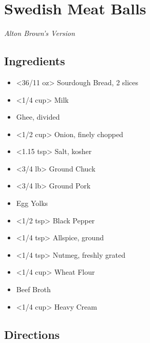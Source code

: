 \section{Swedish Meat Balls}
\textit{ Alton Brown's Version }

\subsection{ Ingredients }

\begin{itemize}
  \item <36/11 oz> Sourdough Bread, 2 slices
  \item <1/4 cup> Milk
  \item <3 tbs> Ghee, divided
  \item <1/2 cup> Onion, finely chopped
  \item <1.15 tsp> Salt, kosher
  \item <3/4 lb> Ground Chuck
  \item <3/4 lb> Ground Pork
  \item <2 yolks> Egg Yolks
  \item <1/2 tsp> Black Pepper
  \item <1/4 tsp> Allspice, ground
  \item <1/4 tsp> Nutmeg, freshly grated
  \item <1/4 cup> Wheat Flour
  \item <3 cup> Beef Broth
  \item <1/4 cup> Heavy Cream
\end{itemize}

\subsection{ Directions }

